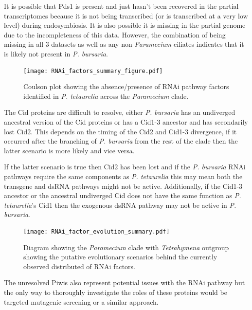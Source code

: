 It is possible that Pds1 is present and just hasn't been recovered 
in the partial transcriptomes because it is not being transcribed (or is 
transcribed at a very low level) during endosymbiosis.  It is also
possible it is missing in the partial genome due to the incompleteness
of this data.  However, the combination of being missing in all 3 datasets
as well as any non-\textit{Paramecium} ciliates indicates that
it is likely not present in \textit{P. bursaria}.

\begin{figure}
    \centering
    \texttt{[image: RNAi\_factors\_summary\_figure.pdf]}
    \caption[Summary of RNAi factors in \textit{Paramecium} species]{Coulson plot
        showing the absence/presence of RNAi pathway factors
    identified in \textit{P. tetaurelia} \citep{Marker2014} across the \textit{Paramecium}
clade.}
    \label{fig:rnai_summary}
\end{figure}

The Cid proteins are difficult to resolve, either \textit{P. bursaria}
has an undiverged ancestral version of the Cid proteins or has a
Cid1-3 ancestor and has secondarily lost Cid2.
This depends on the timing of the Cid2 and Cid1-3 divergence, if
it occurred after the branching of \textit{P. bursaria} from the rest
of the clade then the latter scenario is more likely and vice versa.

If the latter scenario is true then Cid2 has been lost 
and if the \textit{P. bursaria} RNAi
pathways require the same components as \textit{P. tetaurelia} this may
mean both the transgene and dsRNA pathways might not be active. 
Additionally, if the Cid1-3 ancestor or the ancestral undiverged
Cid does not have the same function as \textit{P. tetaurelia}'s Cid1 then
the exogenous dsRNA pathway may not be active in \textit{P. bursaria}.


\begin{figure}
    \texttt{[image: RNAi\_factor\_evolution\_summary.pdf]}
    \caption[Putative scenario for the evolution of RNAi factors in \textit{Paramecium} species]{
        Diagram showing the \textit{Paramecium} clade with \textit{Tetrahymena} outgroup 
        showing the putative evolutionary scenarios behind the currently
        observed distributed of RNAi factors.
    }
    \label{fig:rnai_evol_summary}
\end{figure}

The unresolved Piwis also represent potential issues with the RNAi pathway
but the only way to thoroughly investigate the roles of these proteins would
be targeted mutagenic screening or a similar approach.

